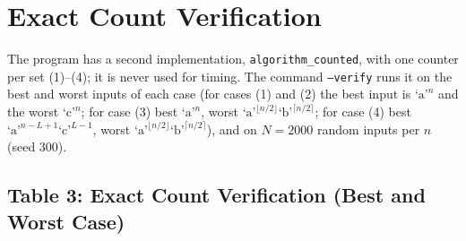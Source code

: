 \documentclass[11pt]{article}
\newcommand{\cha}{\text{`a'}}
\newcommand{\chb}{\text{`b'}}
\newcommand{\chc}{\text{`c'}}
\theoremstyle{remark}
\begin{document}
\section{Exact Count Verification}\label{sec:verify}

The program has a second implementation, \texttt{algorithm\_counted}, with one counter per
set (1)--(4); it is never used for timing. The command \texttt{--verify} runs it on the best
and worst inputs of each case (for cases (1) and (2) the best input is $\cha^n$ and the worst
$\chc^n$; for case (3) best $\cha^n$, worst $\cha^{\lfloor n/2\rfloor}\chb^{\lceil n/2\rceil}$;
for case (4) best $\cha^{n-L+1}\chc^{L-1}$, worst $\cha^{\lfloor n/2\rfloor}\chb^{\lceil n/2\rceil}$),
and on $N=2000$ random inputs per $n$ (seed 300).

\subsection*{Table 3: Exact Count Verification (Best and Worst Case)}
\end{document}
